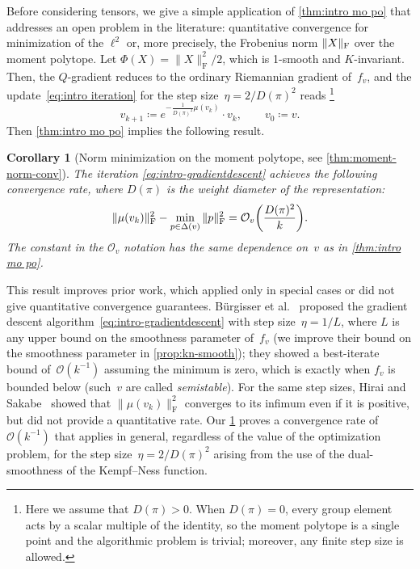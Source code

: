 \documentclass[11pt,letterpaper]{article}
\newtheorem{corollary}[theorem]{Corollary}\AddToHook{env/corollary/begin}{\crefalias{theorem}{corollary}}
\numberwithin{equation}{section}
\DeclarePairedDelimiter\norm{\lVert}{\rVert}
\begin{document}
Before considering tensors, we give a simple application of \cref{thm:intro mo po} that addresses an open problem in the literature: quantitative convergence for minimization of the $\ell^2$ or, more precisely, the Frobenius norm $\norm X_{\mathrm F}$ over the moment polytope.
Let $\Phi(X) = \|X\|_{\mathrm{F}}^2/2$, which is 1-smooth and $K$-invariant.
Then, the $Q$-gradient reduces to the ordinary Riemannian gradient of~$f_v$, and the update~\eqref{eq:intro iteration} for the step size~$\eta=2/D(\pi)^2$ reads%
\footnote{Here we assume that $D(\pi)>0$. When $D(\pi)=0$, every group element acts by a scalar multiple of the identity, so the moment polytope is a single point and the algorithmic problem is trivial; moreover, any finite step size is allowed.}
\begin{equation}\label{eq:intro-gradientdescent}
    v_{k+1} \coloneqq e^{-\frac1{D(\pi)^2}\mu(v_k)}\cdot v_k, \qquad v_0 \coloneqq v.
\end{equation}
Then \cref{thm:intro mo po} implies the following result.

\begin{corollary}[Norm minimization on the moment polytope, see \cref{thm:moment-norm-conv}]\label{cor:intro-moment-norm-conv}
    The iteration \eqref{eq:intro-gradientdescent} achieves the following convergence rate, where $D(\pi)$ is the weight diameter of the representation:
    \begin{equation*}
        \|\mu(v_k)\|_{\mathrm{F}}^2 - \min_{p \in \Delta(v)}\|p\|_{\mathrm{F}}^2 = \mathcal{O}_v\mleft( \frac{D(\pi)^2} k \mright).
    \end{equation*}
    The constant in the $\mathcal{O}_v$ notation has the same dependence on~$v$ as in \cref{thm:intro mo po}.
\end{corollary}

\noindent
This result improves prior work, which applied only in special cases or did not give quantitative convergence guarantees.
B\"{u}rgisser et al.~\cite{BFGOWW2019} proposed the gradient descent algorithm~\eqref{eq:intro-gradientdescent} with step size~$\eta=1/L$, where $L$ is any upper bound on the smoothness parameter of~$f_v$ (we improve their bound on the smoothness parameter in \cref{prop:kn-smooth}); they showed a best-iterate bound of~$\mathcal{O}(k^{-1})$ assuming the minimum is zero, which is exactly when $f_v$ is bounded below (such~$v$ are called \emph{semistable}).
For the same step sizes, Hirai and Sakabe~\cite{HiraiSakabe2024} showed that $\|\mu(v_k)\|_{\mathrm{F}}^2$ converges to its infimum even if it is positive, but did not provide a quantitative rate.
Our \cref{cor:intro-moment-norm-conv} proves a convergence rate of~$\mathcal{O}(k^{-1})$ that applies in general, regardless of the value of the optimization problem, for the step size~$\eta=2/D(\pi)^2$ arising from the use of the dual-smoothness of the Kempf--Ness function.
\end{document}
